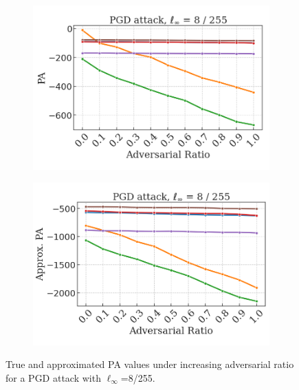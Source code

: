 \begin{figure}[H]
    \centering
    \begin{subfigure}[b]{0.45\textwidth}
        \centering
        \includegraphics[width=\textwidth]{img/results_discussion/adversarial/pgd_pa_approx.png}
    \end{subfigure}
    \begin{subfigure}[b]{0.45\textwidth}
        \centering
        \includegraphics[width=\textwidth]{img/results_discussion/adversarial/pgd_pa_approx_approx.png}
    \end{subfigure}

    \caption{True and approximated PA values under increasing adversarial ratio for
    a PGD attack with $\ell_\infty$=8/255.}
    \label{fig:appendix_adversarial_approx_pa_pgd}
\end{figure}

